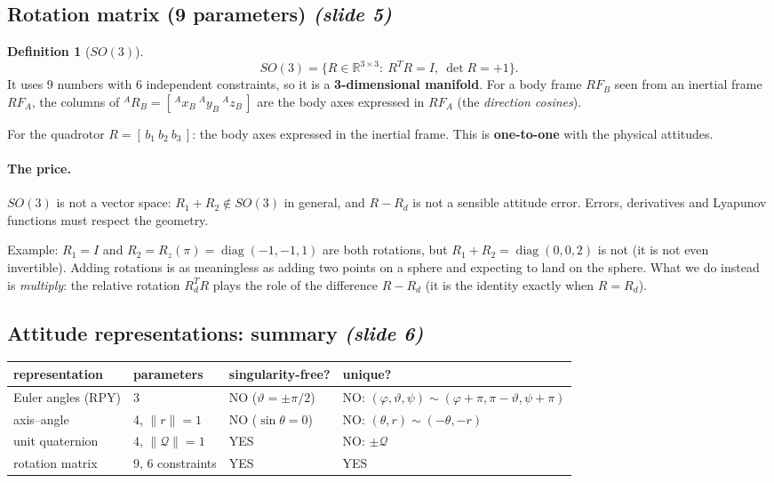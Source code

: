 \documentclass[11pt,a4paper]{article}
\newcommand{\R}{\mathbb{R}}
\newcommand{\diag}{\operatorname{diag}}
\newcommand{\sli}[1]{\emph{(#1)}}
\theoremstyle{definition}
\newtheorem{definition}{Definition}[section]
\theoremstyle{plain}
\theoremstyle{remark}
\begin{document}
\subsection{Rotation matrix (9 parameters) \sli{slide 5}}

\begin{definition}[$SO(3)$]
\[
SO(3)=\{R\in\R^{3\times3}:\ R^TR=I,\ \det R=+1\}.
\]
It uses 9 numbers with 6 independent constraints, so it is a \textbf{3-dimensional manifold}. For a body frame $RF_B$ seen from an inertial frame $RF_A$, the columns of ${}^A\!R_B=[\,{}^Ax_B\ {}^Ay_B\ {}^Az_B\,]$ are the body axes expressed in $RF_A$ (the \emph{direction cosines}).
\end{definition}

For the quadrotor $R=[\,b_1\ b_2\ b_3\,]$: the body axes expressed in the inertial frame. This is \textbf{one-to-one} with the physical attitudes.

\paragraph{The price.} $SO(3)$ is not a vector space: $R_1+R_2\notin SO(3)$ in general, and $R-R_d$ is not a sensible attitude error. Errors, derivatives and Lyapunov functions must respect the geometry.

\begin{intuition}
Example: $R_1=I$ and $R_2=R_z(\pi)=\diag(-1,-1,1)$ are both rotations, but $R_1+R_2=\diag(0,0,2)$ is not (it is not even invertible). Adding rotations is as meaningless as adding two points on a sphere and expecting to land on the sphere. What we do instead is \emph{multiply}: the relative rotation $R_d^TR$ plays the role of the difference $R-R_d$ (it is the identity exactly when $R=R_d$).
\end{intuition}

\subsection{Attitude representations: summary \sli{slide 6}}

\begin{center}
\small
\begin{tabular}{l l l l}
\toprule
representation & parameters & singularity-free? & unique? \\
\midrule
Euler angles (RPY) & 3 & NO ($\vartheta=\pm\pi/2$) & NO: $(\varphi,\vartheta,\psi)\sim(\varphi+\pi,\pi-\vartheta,\psi+\pi)$ \\
axis--angle & 4, $\|r\|=1$ & NO ($\sin\theta=0$) & NO: $(\theta,r)\sim(-\theta,-r)$ \\
unit quaternion & 4, $\|\mathcal Q\|=1$ & YES & NO: $\pm\mathcal Q$ \\
rotation matrix & 9, 6 constraints & YES & YES \\
\bottomrule
\end{tabular}
\end{center}
\end{document}
